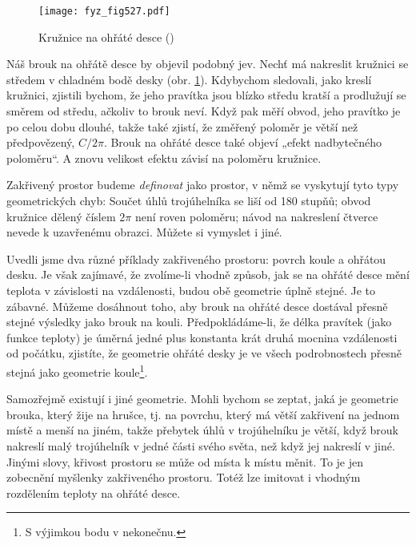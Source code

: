 {    \begin{figure}[ht!] %
      \centering
      \texttt{[image: fyz\_fig527.pdf]}
      \caption{Kružnice na ohřáté desce
               (\cite[s.~779]{Feynman02})}
      \label{fyz:fig527}
    \end{figure}
    
    Náš brouk na ohřátě desce by objevil podobný jev. Nechť má nakreslit kružnici se středem v 
    chladném bodě desky (obr. \ref{fyz:fig527}). Kdybychom sledovali, jako kreslí kružnici, 
    zjistili bychom, že jeho pravítka jsou blízko středu kratší a prodlužují se směrem od středu, 
    ačkoliv to brouk neví. Když pak měří obvod, jeho pravítko je po celou dobu dlouhé, takže také 
    zjistí, že změřený poloměr je větší než předpovězený, \(C/2\pi\). Brouk na ohřáté desce také 
    objeví „efekt nadbytečného poloměru“. A znovu velikost efektu závisí na poloměru kružnice.
    
    Zakřivený prostor budeme \emph{definovat} jako prostor, v němž se vyskytují tyto typy 
    geometrických chyb: Součet úhlů trojúhelníka se liší od \num{180} stupňů; obvod kružnice dělený 
    číslem \(2\pi\) není roven poloměru; návod na nakreslení čtverce nevede k uzavřenému obrazci. 
    Můžete si vymyslet i jiné.
    
    Uvedli jsme dva různé příklady zakřiveného prostoru: povrch koule a ohřátou desku. Je však 
    zajímavé, že zvolíme-li vhodně způsob, jak se na ohřáté desce mění teplota v závislosti na 
    vzdálenosti, budou obě geometrie úplně stejné. Je to zábavné. Můžeme dosáhnout toho, aby brouk 
    na ohřáté desce dostával přesně stejné výsledky jako brouk na kouli. Předpokládáme-li, že délka 
    pravítek (jako funkce teploty) je úměrná jedné plus konstanta krát druhá mocnina vzdálenosti od 
    počátku, zjistíte, že geometrie ohřáté desky je ve všech podrobnostech přesně stejná jako 
    geometrie koule\footnote{S výjimkou bodu v nekonečnu.}. 
    
    Samozřejmě existují i jiné geometrie. Mohli bychom se zeptat, jaká je geometrie brouka, který 
    žije na hrušce, tj. na povrchu, který má větší zakřivení na jednom místě a menší na jiném, 
    takže přebytek úhlů v trojúhelníku je větší, když brouk nakreslí malý trojúhelník v jedné části 
    svého světa, než když jej nakreslí v jiné. Jinými slovy, křivost prostoru se může od místa k 
    místu měnit. To je jen zobecnění myšlenky zakřiveného prostoru. Totéž lze imitovat i vhodným 
    rozdělením teploty na ohřáté desce. 
    
}
